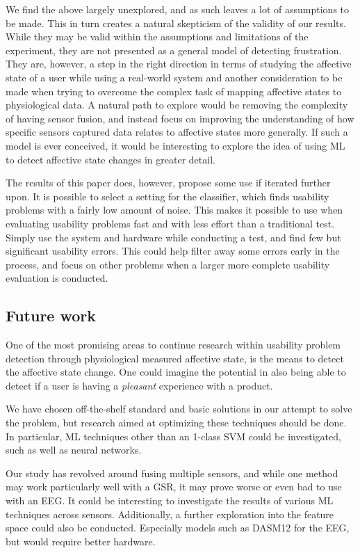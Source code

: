 We find the above largely unexplored, and as such leaves a lot of assumptions to be made.
This in turn creates a natural skepticism of the validity of our results.
While they may be valid within the assumptions and limitations of the experiment, they are not presented as a general model of detecting frustration. 
They are, however, a step in the right direction in terms of studying the affective state of a user while using a real-world system and another consideration to be made when trying to overcome the complex task of mapping affective states to physiological data. 
A natural path to explore would be removing the complexity of having sensor fusion, and instead focus on improving the understanding of how specific sensors captured data relates to affective states more generally. 
If such a model is ever conceived, it would be interesting to explore the idea of using ML to detect affective state
changes in greater detail.

The results of this paper does, however, propose some use if iterated further upon. 
It is possible to select a setting for the classifier, which finds usability problems with a fairly low amount of noise. 
This makes it possible to use when evaluating usability problems fast and with less effort than a traditional test. 
Simply use the system and hardware while conducting a test, and find few but significant usability errors. 
This could help filter away some errors early in the process, and focus on other problems when a larger more complete usability evaluation is conducted. 

\subsection{Future work}
One of the most promising areas to continue research within usability problem detection through physiological measured
affective state, is the means to detect the affective state change. One could imagine the potential in also being able
to detect if a user is having a \textit{pleasant} experience with a product.

We have chosen off-the-shelf standard and basic solutions in our attempt to solve the problem, but research aimed at optimizing these techniques should be done. 
In particular, ML techniques other than an 1-class SVM could be investigated, such as well as neural networks.

Our study has revolved around fusing multiple sensors, and while one method may work particularly well with a GSR, it may prove worse or even bad to use with an EEG. 
It could be interesting to investigate the results of various ML techniques across sensors.
Additionally, a further exploration into the feature space could also be conducted. 
Especially models such as DASM12\cite{eeg_music_listening} for the EEG, but would require better hardware.

